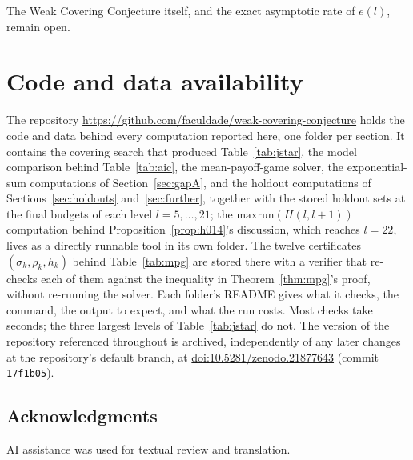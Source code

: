 \documentclass[11pt]{amsart}
\theoremstyle{plain}
\theoremstyle{definition}
\theoremstyle{remark}
\begin{document}
The Weak Covering Conjecture itself, and the exact asymptotic rate of $e(l)$, remain open.

\section{Code and data availability}
\label{sec:code}

The repository \url{https://github.com/faculdade/weak-covering-conjecture} holds the code and data
behind every computation reported here, one folder per section. It contains the covering search
that produced Table~\ref{tab:jstar}, the model comparison behind Table~\ref{tab:aic}, the
mean-payoff-game solver, the exponential-sum computations of Section~\ref{sec:gapA}, and the
holdout computations of Sections~\ref{sec:holdouts} and~\ref{sec:further}, together with the
stored holdout sets at the final budgets of each level $l=5,\dots,21$; the $\mathrm{maxrun}(H(l,l+1))$
computation behind Proposition~\ref{prop:h014}'s discussion, which reaches $l=22$, lives as a
directly runnable tool in its own folder. The twelve certificates
$(\sigma_k,\rho_k,h_k)$ behind Table~\ref{tab:mpg} are stored there with a verifier that re-checks
each of them against the inequality in Theorem~\ref{thm:mpg}'s proof, without re-running the
solver. Each folder's README gives what it checks, the command, the output to expect, and what the
run costs. Most checks take seconds; the three largest levels of Table~\ref{tab:jstar} do not.
The version of the repository referenced throughout is archived, independently of any later
changes at the repository's default branch, at
\href{https://doi.org/10.5281/zenodo.21877643}{doi:10.5281/zenodo.21877643} (commit
\texttt{17f1b05}).

\subsection*{Acknowledgments}
AI assistance was used for textual review and translation.
\end{document}
